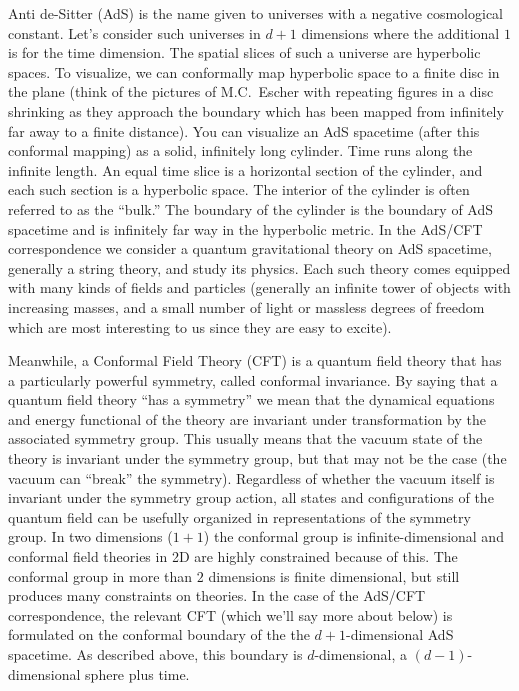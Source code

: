 \documentclass[11pt]{report}
\theoremstyle{plain}
\theoremstyle{definition}
\begin{document}
   Anti de-Sitter (AdS)  is the name given to universes with a negative cosmological constant.  Let's consider such universes in $d+1$ dimensions where the additional $1$ is for the time dimension.   The spatial slices of such a universe are hyperbolic spaces.   To visualize, we can conformally map  hyperbolic space to a finite disc in the plane (think of the pictures of M.C.\ Escher with repeating figures in a disc shrinking as they approach the boundary which has been mapped from infinitely far away to a finite distance).      You can visualize an AdS spacetime (after this conformal mapping) as a solid, infinitely long cylinder.  Time runs along the infinite length.   An equal time slice is a horizontal section of the cylinder, and each such section is a hyperbolic space.  The interior of the cylinder is often referred to as the ``bulk.''  The boundary of the cylinder is the boundary of AdS spacetime and is  infinitely far way in the hyperbolic metric.  In the AdS/CFT correspondence we consider a quantum gravitational theory on AdS spacetime, generally a string theory, and study its physics.  Each such theory comes equipped with many kinds of fields and particles (generally an infinite tower of objects with increasing masses, and a small number of light or massless degrees of freedom which are most interesting to us since they are easy to excite).

   Meanwhile, a Conformal Field Theory (CFT) is a quantum field theory that has a particularly powerful symmetry, called conformal invariance.   By saying that a quantum field theory ``has a symmetry'' we mean that the dynamical equations and energy functional of the theory are invariant under transformation by the associated symmetry group.   This usually means that the vacuum state of the theory is invariant under the symmetry group, but that may not be the case (the vacuum can ``break'' the symmetry).  Regardless of whether the vacuum itself is invariant under the symmetry group action, all states and configurations of the quantum field can be usefully organized in representations of the symmetry group.      In two dimensions ($1+1$) the conformal group is infinite-dimensional and conformal field theories in 2D are highly constrained because of this.  The conformal group in more than $2$ dimensions is finite dimensional, but still produces many constraints on theories.     In the case of the AdS/CFT correspondence, the relevant CFT (which we'll say more about below) is formulated on the conformal boundary of the the $d+1$-dimensional AdS spacetime.  As described above, this boundary is $d$-dimensional, a $(d-1)$-dimensional sphere plus time.
\end{document}
